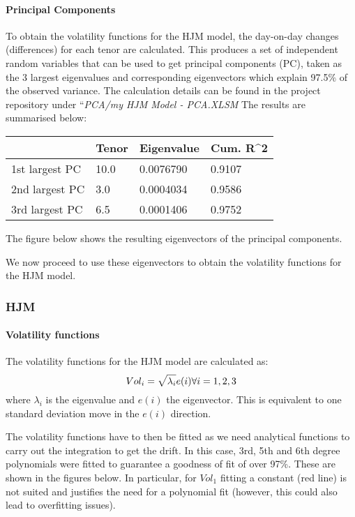 \documentclass{article}
\begin{document}
    \paragraph{Principal Components}\label{principal-components}

    To obtain the volatility functions for the HJM model, the day-on-day
changes (differences) for each tenor are calculated. This produces a set
of independent random variables that can be used to get principal
components (PC), taken as the 3 largest eigenvalues and corresponding
eigenvectors which explain 97.5\% of the observed variance. The
calculation details can be found in the project repository under
``\emph{PCA/my HJM Model - PCA.XLSM} The results are summarised below:

\begin{longtable}[c]{@{}llll@{}}
\toprule
& Tenor & Eigenvalue & Cum. R\^{}2\tabularnewline
\midrule
\endhead
1st largest PC & 10.0 & 0.0076790 & 0.9107\tabularnewline
2nd largest PC & 3.0 & 0.0004034 & 0.9586\tabularnewline
3rd largest PC & 6.5 & 0.0001406 & 0.9752\tabularnewline
\bottomrule
\end{longtable}

The figure below shows the resulting eigenvectors of the principal
components.

    \begin{center}
    \end{center}
    
    We now proceed to use these eigenvectors to obtain the volatility
functions for the HJM model.

    \subsubsection{HJM}\label{hjm}

    \paragraph{Volatility functions}\label{volatility-functions}

    The volatility functions for the HJM model are calculated as: \[
Vol_i = \sqrt{\lambda_i} \space e(i) \space\space\space \forall \space i=1,2,3
\] where \(\lambda_i\) is the eigenvalue and \(e(i)\) the eigenvector.
This is equivalent to one standard deviation move in the \(e(i)\)
direction.

The volatility functions have to then be fitted as we need analytical
functions to carry out the integration to get the drift. In this case,
3rd, 5th and 6th degree polynomials were fitted to guarantee a goodness
of fit of over 97\%. These are shown in the figures below. In
particular, for \(Vol_{1}\) fitting a constant (red line) is not suited
and justifies the need for a polynomial fit (however, this could also
lead to overfitting issues).
\end{document}
